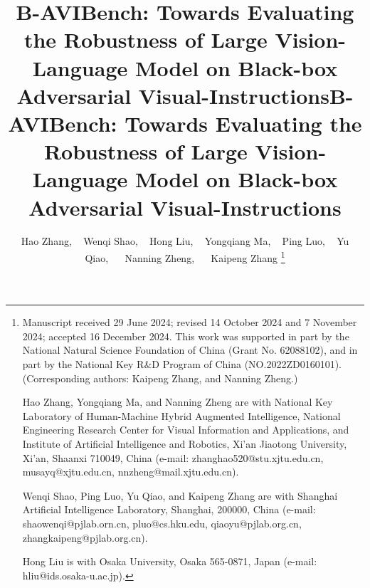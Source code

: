 \title{B-AVIBench: Towards Evaluating the Robustness of Large Vision-Language Model on Black-box Adversarial Visual-Instructions}



\title{B-AVIBench: Towards Evaluating the Robustness of Large Vision-Language Model on Black-box Adversarial Visual-Instructions}

\author{
    Hao Zhang,
    ~
    Wenqi Shao,
    ~
    Hong Liu,
    ~
    Yongqiang Ma,
    ~
    Ping Luo,
    ~
    Yu Qiao,~    
    ~
    Nanning Zheng,~  
    ~
    Kaipeng Zhang
\thanks{
Manuscript received 29 June 2024; revised 14 October 2024 and 7 November 2024; accepted 16 December 2024.
This work was supported in part by the National Natural Science Foundation of China (Grant No. 62088102), and in part by the National Key R$\&$D Program of China (NO.2022ZD0160101).
(Corresponding authors: Kaipeng Zhang, and Nanning Zheng.)

Hao Zhang, Yongqiang Ma, and Nanning Zheng are with National Key Laboratory of Human-Machine Hybrid Augmented Intelligence, National Engineering Research Center for Visual Information and Applications, and Institute of Artificial Intelligence and Robotics, Xi'an Jiaotong University, Xi’an, Shaanxi 710049, China (e-mail: zhanghao520@stu.xjtu.edu.cn, musayq@xjtu.edu.cn, nnzheng@mail.xjtu.edu.cn).

Wenqi Shao, Ping Luo, Yu Qiao, and Kaipeng Zhang are with Shanghai Artificial Intelligence Laboratory, Shanghai, 200000, China (e-mail: shaowenqi@pjlab.orn.cn, pluo@cs.hku.edu, qiaoyu@pjlab.org.cn, zhangkaipeng@pjlab.org.cn).

Hong Liu is with Osaka University, Osaka 565-0871, Japan (e-mail: hliu@ids.osaka-u.ac.jp).
}
}

\maketitle

